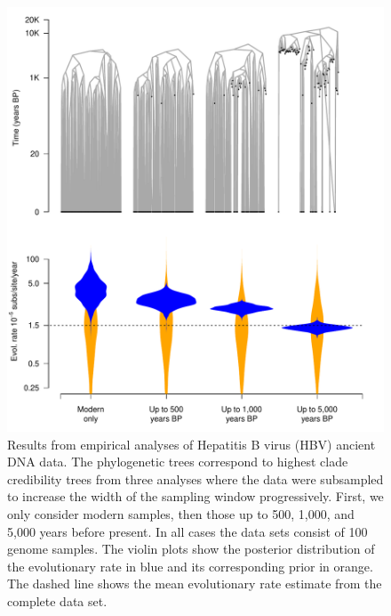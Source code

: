 \documentclass[11pt]{article}
\begin{document}
\begin{figure}[H]
    \begin{center}
        \includegraphics[scale=0.7, angle=0]{empirical_results_depth.pdf}
        \caption{Results from empirical analyses of Hepatitis B virus (HBV) ancient DNA data. The phylogenetic trees correspond to highest clade credibility trees from three analyses where the data were subsampled to increase the width of the sampling window progressively. First, we only consider modern samples, then those up to 500, 1,000, and 5,000 years before present. In all cases the data sets consist of 100 genome samples. The violin plots show the posterior distribution of the evolutionary rate in blue and its corresponding prior in orange. The dashed line shows the mean evolutionary rate estimate from the complete data set.}
        \label{figure:Fig6}
    \end{center}
\end{figure}
\end{document}
